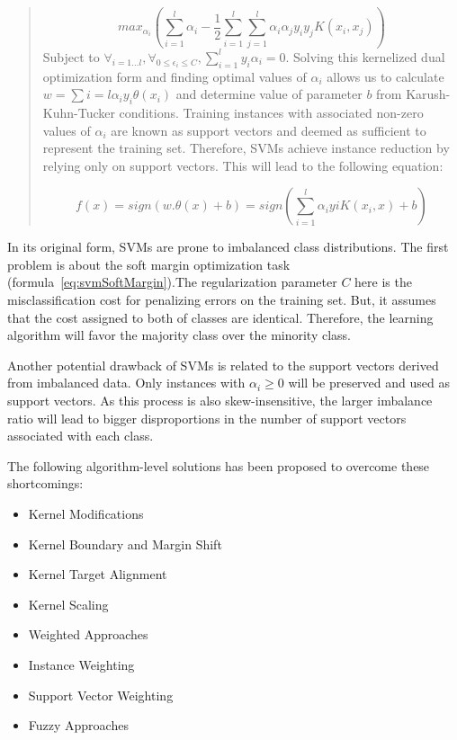 \begin{quote}
    \begin{equation}
        max_{\alpha_{i}} \left ( \sum_{i=1}^{l}\alpha_{i} - \frac{1}{2}\sum_{i=1}^{l}\sum_{j=1}^{l}\alpha_{i}\alpha_{j}y_{i}y_{j} K(x_{i},x_{j}) \right )
        \label{eq:svmOptimization}
    \end{equation}
    Subject to $\forall_{i=1...l}, \forall_{0\leq\epsilon_{i} \leq C}, \sum_{i=1}^{l} y_{i}\alpha_{i}=0$. 
    Solving this kernelized dual optimization form and finding optimal values of $\alpha_{i}$ allows us 
    to calculate $w=\sum i = l\alpha_{i}y_{i}\theta(x_{i})$ and determine value of parameter $b$ from 
    Karush-Kuhn-Tucker conditions. Training instances with associated non-zero values of $\alpha_{i}$ 
    are known as support vectors and deemed as sufficient to represent the training set. 
    Therefore, SVMs achieve instance reduction by relying only on support vectors. This will lead to 
    the following equation:

    \begin{equation}
        f(x)= sign (w.\theta(x)+b) = sign \left ( \sum_{i=1}^{l}\alpha_{i}y{i}K(x_{i},x)+b \right )
        \label{eq:svmFinal}
    \end{equation}


\end{quote}

In its original form, SVMs are prone to imbalanced class distributions. The first problem 
is about the soft margin optimization task (formula~\ref{eq:svmSoftMargin}).The regularization parameter 
$C$ here is the misclassification cost for penalizing errors on the training set. But, it 
assumes that the cost assigned to both of classes are identical. Therefore, the learning 
algorithm will favor the majority class over the minority class.

Another potential drawback of SVMs is related to the support vectors derived from imbalanced data. 
Only instances with $\alpha_{i} \geq0$ will be preserved and used as support vectors. As this 
process is also skew-insensitive, the larger imbalance ratio will lead to bigger disproportions in 
the number of support vectors associated with each class. 

The following algorithm-level solutions has been proposed to overcome these shortcomings:
\begin{itemize}
    \item \small{Kernel Modifications}
    \item \small{Kernel Boundary and Margin Shift}
    \item \small{Kernel Target Alignment}
    \item \small{Kernel Scaling}
    \item \small{Weighted Approaches}
    \item \small{Instance Weighting}
    \item \small{Support Vector Weighting}
    \item \small{Fuzzy Approaches}
\end{itemize}


